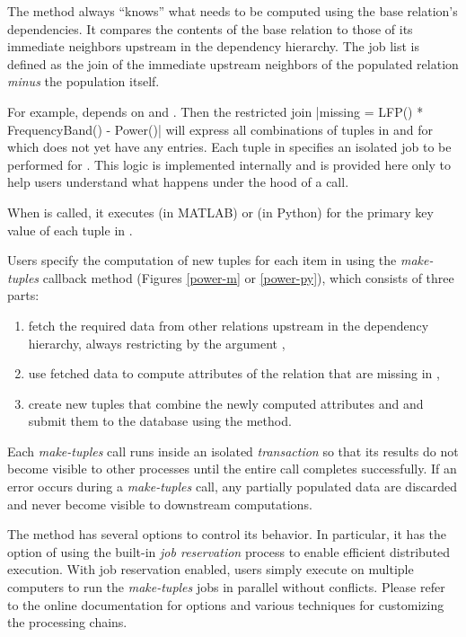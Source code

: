 The  method always ``knows'' what needs to be computed using the base relation's dependencies.
It compares the contents of the base relation to those of its immediate neighbors upstream in the dependency hierarchy. 
The job list is defined as the join of the immediate upstream neighbors of the populated relation \emph{minus} the population itself.

For example,  depends on  and . 
Then the restricted join 
|missing = LFP() * FrequencyBand() - Power()|
will express  all combinations of tuples in  and  for which  does not yet have any entries.
Each tuple in  specifies an isolated job to be performed for .
This logic is implemented internally and is provided here only to help users understand what happens under the hood of a  call.

When  is called, it executes   (in MATLAB) or  (in Python) for the primary key value  of each tuple in .

Users specify the computation of new tuples for each item in  using the \emph{make-tuples} callback method (Figures \ref{power-m} or \ref{power-py}),
which consists of three parts: 
\begin{enumerate}
\item fetch the required data from other relations upstream in the dependency hierarchy, always restricting by the argument ,
\item use fetched data to compute attributes of the relation that are missing in ,
\item create new tuples that combine the newly computed attributes and  and submit them to the database using the  method.
\end{enumerate}

Each \emph{make-tuples} call runs inside an isolated \emph{transaction} so that its results  do not become visible to other processes until the entire call completes successfully. 
If an error occurs during a \emph{make-tuples} call, any partially populated data are discarded and never become visible to downstream computations.

The  method has several options to control its behavior. 
In particular, it has the option of using the built-in \emph{job reservation} process to enable efficient distributed execution. 
With job reservation enabled, users simply execute  on multiple computers to run the \emph{make-tuples} jobs in parallel  without conflicts.
Please refer to the online documentation for  options and various techniques for customizing the processing chains.
